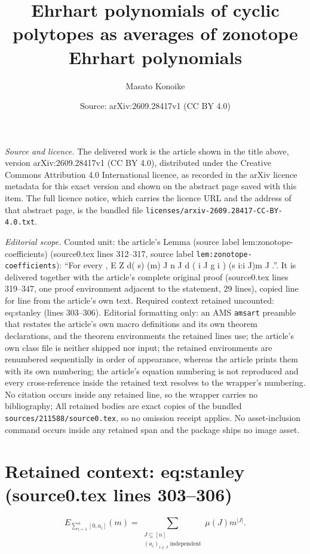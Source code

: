 \documentclass[10pt,a4paper]{amsart}
\title[Ehrhart polynomials of cyclic polytopes as averages of zonotope Ehrhart polynomials]{Ehrhart polynomials of cyclic polytopes as averages of zonotope Ehrhart polynomials}
\author{Masato Konoike}
\date{Source: arXiv:2609.28417v1 (CC BY 4.0)}
\theoremstyle{plain}
\theoremstyle{definition}
\theoremstyle{remark}
\begin{document}
\maketitle

\noindent\emph{Source and licence.} The delivered work is the article shown in the title above, version arXiv:2609.28417v1 (CC BY 4.0), distributed under the Creative Commons Attribution 4.0 International licence, as recorded in the arXiv licence metadata for this exact version and shown on the abstract page saved with this item. The full licence notice, which carries the licence URL and the address of that abstract page, is the bundled file \texttt{licenses/arxiv-2609.28417-CC-BY-4.0.txt}.
\par\smallskip

\noindent\textit{Editorial scope.} Counted unit: the article's Lemma (source label lem:zonotope-coefficients) (source0.tex lines 312--317, source label \texttt{lem:zonotope-coefficients}): ``For every , E Z d( s) (m) J n J d ( i J g i ) (s i:i J)m J .''. It is delivered together with the article's complete original proof (source0.tex lines 319--347, one proof environment adjacent to the statement, 29 lines), copied line for line from the article's own text. Required context retained uncounted: eq:stanley (lines 303--306). Editorial formatting only: an AMS \texttt{amsart} preamble that restates the article's own macro definitions and its own theorem declarations, and the theorem environments the retained lines use; the article's own class file is neither shipped nor input; the retained environments are renumbered sequentially in order of appearance, whereas the article prints them with its own numbering; the article's equation numbering is not reproduced and every cross-reference inside the retained text resolves to the wrapper's numbering. No citation occurs inside any retained line, so the wrapper carries no bibliography; All retained bodies are exact copies of the bundled \texttt{sources/211588/source0.tex}, so no omission receipt applies. No asset-inclusion command occurs inside any retained span and the package ships no image asset.


\section*{Retained context: eq:stanley (source0.tex lines 303--306)}

\begin{equation}\label{eq:stanley}
    E_{\sum_{i=1}^n[0,a_i]}(m)
    =\sum_{\substack{J\subseteq[n]\\(a_i)_{i\in J}\text{ independent}}} \mu(J)m^{|J|}.
\end{equation}
\end{document}
